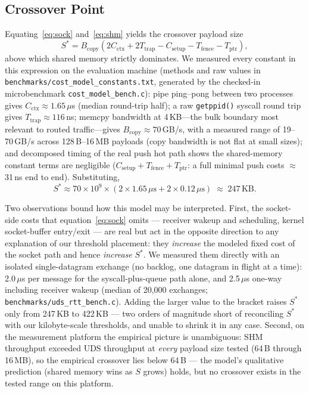 \documentclass[conference]{IEEEtran}
\begin{document}
\subsection{Crossover Point}
Equating~\eqref{eq:sock} and~\eqref{eq:shm} yields the crossover payload size
\begin{equation}
S^{*} = B_{\mathrm{copy}}\left(2C_{\mathrm{ctx}} + 2T_{\mathrm{trap}}
- C_{\mathrm{setup}} - T_{\mathrm{fence}} - T_{\mathrm{ptr}}\right),
\label{eq:crossover}
\end{equation}
above which shared memory strictly dominates. We measured every constant in
this expression on the evaluation machine (methods and raw values in
\texttt{benchmarks/cost\_model\_constants.txt}, generated by the checked-in
microbenchmark \texttt{cost\_model\_bench.c}): pipe ping--pong between two
processes gives $C_{\mathrm{ctx}} \approx 1.65\,\mu$s (median round-trip
half); a raw \texttt{getppid()} syscall round trip gives
$T_{\mathrm{trap}} \approx 116$\,ns; memcpy bandwidth at 4\,KB---the bulk
boundary most relevant to routed traffic---gives
$B_{\mathrm{copy}} \approx 70$\,GB/s, with a measured range of
19--70\,GB/s across 128\,B--16\,MB payloads (copy bandwidth is not flat at
small sizes); and decomposed timing of the real push hot path shows the
shared-memory constant terms are negligible
($C_{\mathrm{setup}} + T_{\mathrm{fence}} + T_{\mathrm{ptr}}$: a full
minimal push costs $\approx$31\,ns end to end). Substituting,
\begin{equation}
S^{*} \approx 70 \times 10^9 \times
(2 \times 1.65\,\mu\text{s} + 2 \times 0.12\,\mu\text{s})
\;\approx\; 247\,\text{KB}.
\end{equation}

Two observations bound how this model may be interpreted. First, the
socket-side costs that equation~\eqref{eq:sock} omits --- receiver wakeup
and scheduling, kernel socket-buffer entry/exit --- are real but act in the
opposite direction to any explanation of our threshold placement: they
\emph{increase} the modeled fixed cost of the socket path and hence
\emph{increase} $S^{*}$. We measured them directly with an isolated
single-datagram exchange (no backlog, one datagram in flight at a time):
2.0\,$\mu$s per message for the syscall-plus-queue path alone, and
2.5\,$\mu$s one-way including receiver wakeup (median of 20{,}000
exchanges; \texttt{benchmarks/uds\_rtt\_bench.c}). Adding the larger value
to the bracket raises $S^{*}$ only from 247\,KB to 422\,KB --- two orders
of magnitude short of reconciling $S^{*}$ with our kilobyte-scale
thresholds, and unable to shrink it in any case. Second, on the measurement
platform the empirical picture is unambiguous: SHM throughput exceeded UDS
throughput at \emph{every} payload size tested (64\,B through 16\,MB), so
the empirical crossover lies below 64\,B --- the model's qualitative
prediction (shared memory wins as $S$ grows) holds, but no crossover exists
in the tested range on this platform.
\end{document}
